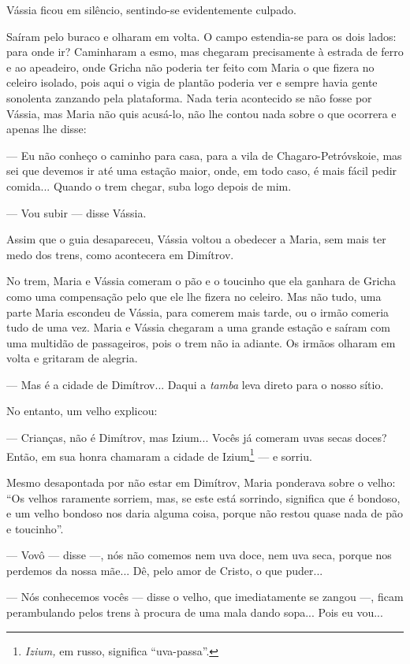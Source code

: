 Vássia ficou em silêncio, sentindo-se evidentemente culpado.

Saíram pelo buraco e olharam em volta. O campo estendia-se para os dois
lados: para onde ir? Caminharam a esmo, mas chegaram precisamente à
estrada de ferro e ao apeadeiro, onde Gricha não poderia ter feito com
Maria o que fizera no celeiro isolado, pois aqui o vigia de plantão
poderia ver e sempre havia gente sonolenta zanzando pela plataforma.
Nada teria acontecido se não fosse por Vássia, mas Maria não quis
acusá-lo, não lhe contou nada sobre o que ocorrera e apenas lhe disse:

--- Eu não conheço o caminho para casa, para a vila de
Chagaro-Petróvskoie, mas sei que devemos ir até uma estação maior, onde,
em todo caso, é mais fácil pedir comida... Quando o trem chegar, suba
logo depois de mim.

--- Vou subir --- disse Vássia.

Assim que o guia desapareceu, Vássia voltou a obedecer a Maria, sem mais
ter medo dos trens, como acontecera em Dimítrov.

No trem, Maria e Vássia comeram o pão e o toucinho que ela ganhara de
Gricha como uma compensação pelo que ele lhe fizera no celeiro. Mas não
tudo, uma parte Maria escondeu de Vássia, para comerem mais tarde, ou o
irmão comeria tudo de uma vez. Maria e Vássia chegaram a uma grande
estação e saíram com uma multidão de passageiros, pois o trem não ia
adiante. Os irmãos olharam em volta e gritaram de alegria.

--- Mas é a cidade de Dimítrov... Daqui a \emph{tamba} leva direto para
o nosso sítio.

No entanto, um velho explicou:

--- Crianças, não é Dimítrov, mas Izium... Vocês já comeram uvas secas
doces? Então, em sua honra chamaram a cidade de Izium\footnote{\emph{Izium,}
  em russo, significa ``uva-passa''.} --- e sorriu.

Mesmo desapontada por não estar em Dimítrov, Maria ponderava sobre o
velho: ``Os velhos raramente sorriem, mas, se este está sorrindo,
significa que é bondoso, e um velho bondoso nos daria alguma coisa,
porque não restou quase nada de pão e toucinho''.

--- Vovô --- disse ---, nós não comemos nem uva doce, nem uva seca,
porque nos perdemos da nossa mãe... Dê, pelo amor de Cristo, o que
puder...

--- Nós conhecemos vocês --- disse o velho, que imediatamente se zangou
---, ficam perambulando pelos trens à procura de uma mala dando sopa...
Pois eu vou...

